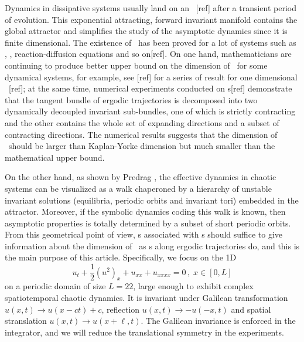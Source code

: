 
Dynamics in dissipative systems usually land on an \inm\ [ref] after a 
transient period of evolution. This exponential attracting, 
forward invariant manifold contains the global attractor and 
simplifies the study of the asymptotic dynamics since it is finite
dimensional. The existence of \inm\ has been proved for a lot 
of systems such as \KSe, \cGLe, reaction-diffusion equations and 
so on[ref]. On one hand, mathematicians are continuing to produce better
upper bound on the dimension of \inm\ for some dynamical systems, 
for example, see [ref] for a series of result for one dimensional
\KSe\ [ref]; at the same time,  numerical experiments conducted on
\cLv s[ref] demonstrate that the tangent bundle of ergodic trajectories 
is decomposed into two dynamically decoupled invariant sub-bundles, one 
of which is strictly contracting and the other contains the whole
set of expanding directions and a subset of contracting directions. The 
numerical results suggests that the dimension of \inm\ 
should be larger than Kaplan-Yorke dimension but much smaller than the 
mathematical upper bound.

On the other hand, 
as shown by Predrag \etc, the effective dynamics in chaotic
systems can be visualized as a walk chaperoned
by a hierarchy of unstable invariant solutions (equilibria, periodic orbits
and invariant tori) embedded in the attractor. Moreover, 
if the symbolic dynamics coding this walk is known, then asymptotic 
properties is totally determined by a subset of short periodic orbits.
From this geometrical
point of view, \Fv s associated with \po s should suffice to give 
information about the dimension of \inm\ as \cLv s along ergodic 
trajectories do, and this is the main purpose of this article.
Specifically,
we focus on the 1D \KSe\
\begin{equation}
  u_t+\frac{1}{2}(u^2)_x+u_{xx}+u_{xxxx}=0\,,\; x\in [0,L]
  \label{eq:ks}
\end{equation}
on a periodic domain of size $L=22$, large enough to 
exhibit complex spatiotemporal chaotic dynamics. It is
invariant under Galilean transformation $u(x,t)\to u(x-ct)+c$,
reflection $u(x,t)\to -u(-x,t)$ and spatial stranslation
$u(x,t) \to u(x+\ell,t)$. The Galilean invariance is 
enforced in the integrator, and we will reduce 
the translational symmetry in the experiments.
